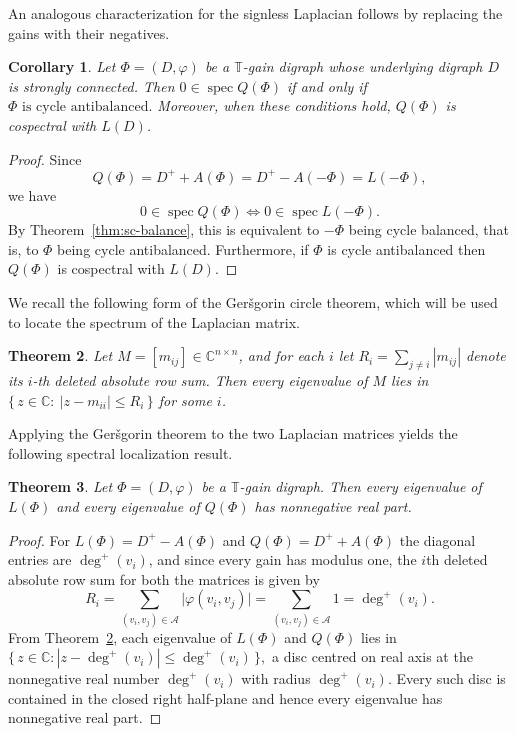\documentclass[12pt]{article}
\newtheorem{theorem}{Theorem}[section]
\newtheorem{corollary}[theorem]{Corollary}
\theoremstyle{definition}
\DeclareMathOperator{\spec}{spec}
\begin{document}
An analogous characterization for the signless Laplacian follows by replacing the gains with their negatives.

\begin{corollary}\label{cor:signless-balance}
Let $\Phi=(D,\varphi)$ be a $\mathbb{T}$-gain digraph whose underlying digraph $D$ is strongly connected. Then $0\in\spec Q(\Phi)$ if and only if $\Phi \text{ is cycle antibalanced}.$ Moreover, when these conditions hold, $Q(\Phi)$ is cospectral with $L(D)$.
\end{corollary}

\begin{proof}
Since
\[
Q(\Phi)=D^{+}+A(\Phi)=D^{+}-A(-\Phi)=L(-\Phi),
\]
we have
\[
0\in\spec Q(\Phi)
\iff
0\in\spec L(-\Phi).
\]
By Theorem~\ref{thm:sc-balance}, this is equivalent to $-\Phi$ being cycle balanced, that is, to $\Phi$ being cycle antibalanced. Furthermore, if $\Phi$ is cycle antibalanced then $Q(\Phi)$ is cospectral with $L(D)$.
\end{proof}

We recall the following form of the Ger\v{s}gorin circle theorem, which will be used to locate the spectrum of the Laplacian matrix.

\begin{theorem} {\cite[p.~388]{HornJohnson}}\label{thm:gersgorin}
Let $M=[m_{ij}]\in\mathbb{C}^{n\times n}$, and for each $i$ let $R_i=\sum_{j\neq i}|m_{ij}|$ denote its $i$-th
deleted absolute row sum. Then every eigenvalue of $M$ lies in 
\(
\bigl\{\,z\in \mathbb{C}:\ |z-m_{ii}|\le R_i\,\bigr\} 
\) for some $i$.
\end{theorem}

Applying the Ger\v{s}gorin theorem to the two Laplacian matrices yields the following spectral localization result.
 
\begin{theorem}\label{thm:LQ-rhp}
Let $\Phi = (D, \varphi)$ be a $\mathbb{T}$-gain digraph. Then every eigenvalue of $L(\Phi)$ and every eigenvalue of $Q(\Phi)$ has nonnegative real part.
\end{theorem}

\begin{proof}
For $L(\Phi) = D^{+} - A(\Phi)$ and $Q(\Phi) = D^{+} + A(\Phi)$ the diagonal entries are $ \deg^{+}(v_i)$, and since every
gain has modulus one, the $i$th deleted absolute row sum for both the matrices is given by
\[
  R_i = \sum_{(v_i,v_j)\in \mathcal{A}} \bigl| \varphi(v_i,v_j) \bigr|
      = \sum_{(v_i,v_j)\in \mathcal{A}} 1 = \deg^{+}(v_i).
\]
From Theorem~\ref{thm:gersgorin}, each eigenvalue of $L(\Phi)$ and $Q(\Phi)$ lies in 
\(
  \bigl\{\, z \in \mathbb{C} : |z - \deg^{+}(v_i)| \le \deg^{+}(v_i) \,\bigr\},
\)
a disc centred on real axis at the nonnegative real number $\deg^{+}(v_i)$ with radius $\deg^{+}(v_i)$. Every such disc is contained in the closed right half-plane and hence every eigenvalue has nonnegative real part.
\end{proof}
\end{document}
